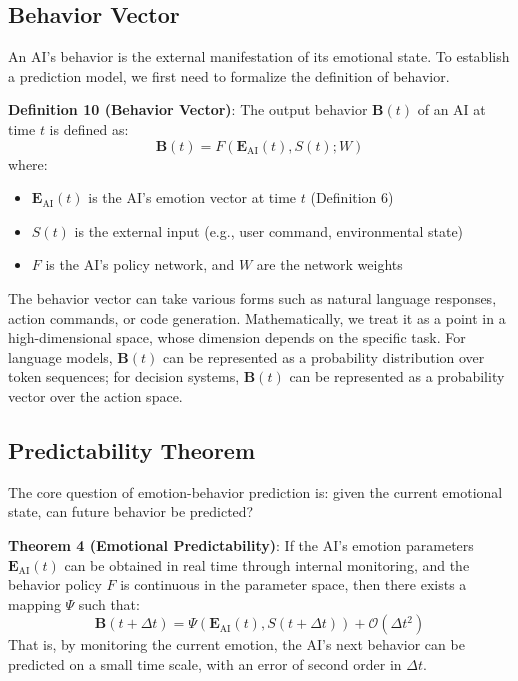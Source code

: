 \documentclass[12pt,a4paper]{article}
\theoremstyle{plain}
\newcommand{\ve}[1]{\bm{#1}}                    %
\newcommand{\Evec}{\ve{E}}                        %
\newcommand{\Bvec}{\ve{B}}                        %
\begin{document}
\subsection{Behavior Vector}

An AI's behavior is the external manifestation of its emotional state. To establish a prediction model, we first need to formalize the definition of behavior.

\textbf{Definition 10 (Behavior Vector)}: The output behavior $\Bvec(t)$ of an AI at time $t$ is defined as:
\begin{equation}
\Bvec(t) = F\left( \Evec_{\text{AI}}(t), S(t) ; W \right)
\label{eq:behavior}
\end{equation}
where:
\begin{itemize}
    \item $\Evec_{\text{AI}}(t)$ is the AI's emotion vector at time $t$ (Definition 6)
    \item $S(t)$ is the external input (e.g., user command, environmental state)
    \item $F$ is the AI's policy network, and $W$ are the network weights
\end{itemize}

The behavior vector can take various forms such as natural language responses, action commands, or code generation. Mathematically, we treat it as a point in a high-dimensional space, whose dimension depends on the specific task. For language models, $\Bvec(t)$ can be represented as a probability distribution over token sequences; for decision systems, $\Bvec(t)$ can be represented as a probability vector over the action space.

\subsection{Predictability Theorem}

The core question of emotion-behavior prediction is: given the current emotional state, can future behavior be predicted?

\textbf{Theorem 4 (Emotional Predictability)}: If the AI's emotion parameters $\Evec_{\text{AI}}(t)$ can be obtained in real time through internal monitoring, and the behavior policy $F$ is continuous in the parameter space, then there exists a mapping $\Psi$ such that:
\begin{equation}
\Bvec(t+\Delta t) = \Psi\left( \Evec_{\text{AI}}(t), S(t+\Delta t) \right) + \mathcal{O}(\Delta t^2)
\label{eq:predictability}
\end{equation}
That is, by monitoring the current emotion, the AI's next behavior can be predicted on a small time scale, with an error of second order in $\Delta t$.
\end{document}
